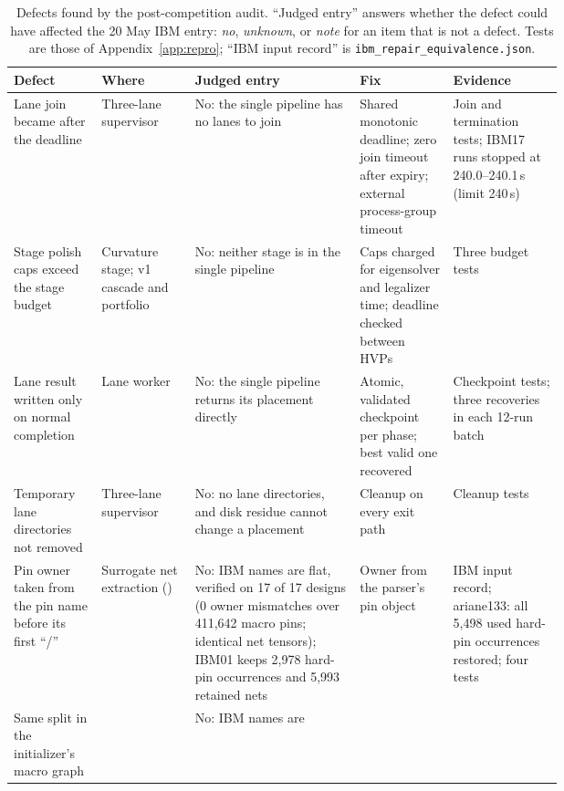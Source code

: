 \begin{table}[htbp]
\centering\footnotesize
\setlength{\tabcolsep}{3pt}
\caption{Defects found by the post-competition audit. ``Judged entry'' answers whether
the defect could have affected the 20 May IBM entry: \emph{no}, \emph{unknown}, or
\emph{note} for an item that is not a defect. Tests are those of
Appendix~\ref{app:repro}; ``IBM input record'' is
\texttt{ibm\_repair\_equivalence.json}.}
\label{tab:defects}
\begin{tabularx}{\linewidth}{@{}>{\raggedright\arraybackslash}p{0.16\linewidth}
                >{\raggedright\arraybackslash}p{0.17\linewidth}
                Y
                >{\raggedright\arraybackslash}p{0.17\linewidth}
                >{\raggedright\arraybackslash}p{0.20\linewidth}@{}}
\toprule
Defect & Where & Judged entry & Fix & Evidence \\
\midrule
Lane join became  after the deadline & Three-lane supervisor &
No: the single pipeline has no lanes to join & Shared monotonic deadline; zero join
timeout after expiry; external process-group timeout & Join and termination tests;
IBM17 runs stopped at 240.0--240.1\,s (limit 240\,s) \\
\addlinespace
Stage polish caps exceed the stage budget & Curvature stage; v1 cascade and portfolio
& No: neither stage is in the single pipeline & Caps charged for eigensolver and
legalizer time; deadline checked between HVPs & Three budget tests \\
\addlinespace
Lane result written only on normal completion & Lane worker & No: the single
pipeline returns its placement directly & Atomic, validated checkpoint per phase; best
valid one recovered & Checkpoint tests; three recoveries in each 12-run batch \\
\addlinespace
Temporary lane directories not removed & Three-lane supervisor & No: no lane
directories, and disk residue cannot change a placement & Cleanup on every exit path &
Cleanup tests \\
\addlinespace
Pin owner taken from the pin name before its first ``/'' & Surrogate net extraction
() & No: IBM names are flat, verified on 17 of 17 designs
(0 owner mismatches over 411,642 macro pins; identical net tensors); IBM01 keeps
2,978 hard-pin occurrences and 5,993 retained nets & Owner from the parser's pin
object & IBM input record; ariane133: all 5,498 used hard-pin occurrences restored;
four tests \\
\addlinespace
Same split in the initializer's macro graph &  & No: IBM names are

\end{tabularx}
\end{table}

